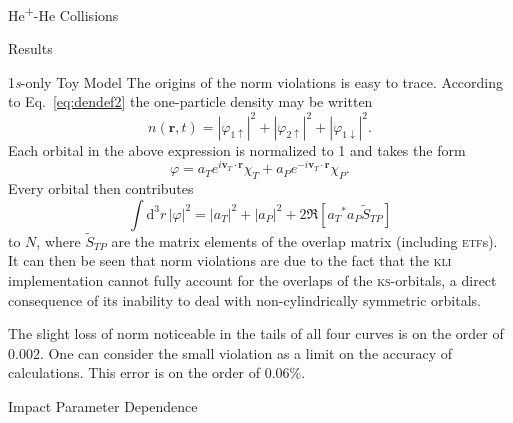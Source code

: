 \documentclass[letterpaper, 11 pt]{report}
\begin{document}
\begin{chapter}{\texorpdfstring{He\textsuperscript{+}}{He+}-He Collisions \label{chap:hephe}}
\begin{section}{Results \label{sec:hephe-disc}}
\begin{subsection}{1\textit{s}-only Toy Model \label{sec:toy}}
         The origins of the norm violations is easy to trace. According to Eq.~\eqref{eq:dendef2} the
         one-particle density may be written
         \begin{equation} \label{eq:toyden}
            n(\mathbf{r},t) = \left| \varphi_{1 \uparrow}\right|^2
                            + \left| \varphi_{2 \uparrow}\right|^2
                            + \left| \varphi_{1 \downarrow}\right|^2.
         \end{equation}
         Each orbital in the above expression is normalized to 1 and takes the form
         \begin{equation}
            \varphi = a_T e^{i \mathbf{v}_T \cdot \mathbf{r}} \chi_T
                    + a_P e^{-i \mathbf{v}_T \cdot \mathbf{r}} \chi_P.
         \end{equation}
         Every orbital then contributes
         \begin{equation}
            \int \mathrm{d}^3 r \, \left| \varphi \right|^2 = \left| a_T \right|^2
                                                            + \left| a_P \right|^2
            + 2 \Re \left[ {a_T}^* a_P \tilde{S}_{TP} \right]
         \end{equation}
         to $N$, where $\tilde{S}_{TP}$ are the matrix elements of the overlap matrix (including
         \textsc{etf}s). It can then be seen that norm violations are due to the fact that
         the \textsc{kli} implementation cannot fully account for the overlaps of the
         \textsc{ks}-orbitals, a direct consequence of its inability to deal with non-cylindrically
         symmetric orbitals.

         The slight loss of norm noticeable in the tails of all four curves is on the order of $0.002$.
         One can consider the small violation as a limit on the accuracy of calculations. This error is
         on the order of $0.06 \%$.

      \end{subsection}

      \begin{subsection}{Impact Parameter Dependence \label{sec:hephepb}}


\end{subsection}
\end{section}
\end{chapter}
\end{document}
